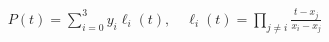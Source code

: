 \documentclass[preview]{standalone}
\begin{document}
\begin{align*}
P(t) = \sum_{i=0}^3 y_i \ell_i(t), \quad \ell_i(t) = \prod_{j \neq i} \frac{t - x_j}{x_i - x_j}
\end{align*}
\end{document}
